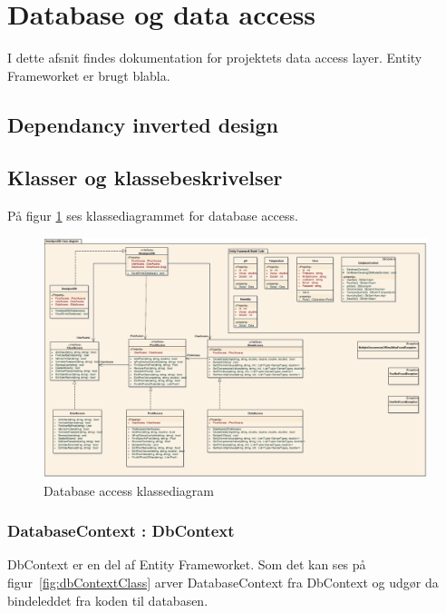 \section{Database og data access}
I dette afsnit findes dokumentation for projektets data access layer. Entity Frameworket er brugt blabla.

\subsection{Dependancy inverted design}


\subsection{Klasser og klassebeskrivelser}
På figur \ref{fig:databaseFullClass} ses klassediagrammet for database access. 

\begin{landscape}
\begin{figure}[h]
\centering
\includegraphics[width=\linewidth]{figs/implementering/databaseFullClass.PNG}
\caption{Database access klassediagram}
\label{fig:databaseFullClass}
\end{figure}
\end{landscape}


\subsubsection{DatabaseContext : DbContext}
DbContext er en del af Entity Frameworket. Som det kan ses på figur~\ref{fig:dbContextClass} arver DatabaseContext fra DbContext \cite{microsoftdbcontext} og udgør da bindeleddet fra koden til databasen.

